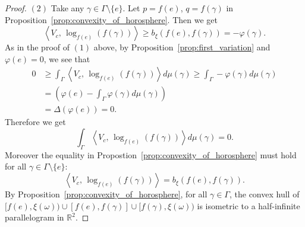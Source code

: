 \documentclass[12pt]{amsart}
\numberwithin{equation}{section}
\theoremstyle{plain}
\theoremstyle{definition}
\theoremstyle{remark}
\newcommand{\R}{{\mathbb R}}
\newcommand{\tcprj}{\log}
\newcommand{\inner}[2]{\left\langle #1,\, #2 \right\rangle}
\begin{document}
\begin{proof}
$(2)$ 
Take any $\gamma \in \Gamma \setminus \{e\}$.
Let $p=f(e)$, $q=f(\gamma)$ in Proposition~\ref{prop:convexity_of_horosphere}. 
Then we get
\begin{equation*}
 \inner{V_c}{\tcprj_{f(e)}(f(\gamma))}
  \geq b_{\xi}(f(e),f(\gamma))
  = -\varphi(\gamma). 
\end{equation*}
As in the proof of $(1)$ above, by
 Proposition~\ref{prop:first_variation} and $\varphi(e)=0$, we see that 
\begin{equation*}
\begin{split}
0 & \geq \int_{\Gamma} \inner{V_c}{\tcprj_{f(e)}(f(\gamma))}
d\mu (\gamma) 
\geq \int_{\Gamma} -\varphi(\gamma) d\mu (\gamma) \\
& = \left(
   \varphi(e) -
    \int_{\Gamma} \varphi(\gamma) d\mu(\gamma)
  \right) \\
& = \Delta (\varphi(e))=0. 
\end{split}
\end{equation*}
Therefore we get
\begin{equation}
\label{eq:harmonic_at_e2}
\int_{\Gamma} \inner{V_c}{\tcprj_{f(e)}(f(\gamma))}
d\mu(\gamma)=0. 
\end{equation}
Moreover the equality in
Propostion~\ref{prop:convexity_of_horosphere} must hold 
for all $\gamma \in \Gamma \setminus \{e\}$: 
 \begin{equation*}
  \inner{V_c}{\tcprj_{f(e)}(f(\gamma))}
  = b_{\xi}(f(e),f(\gamma)). 
 \end{equation*}
 By Proposition~\ref{prop:convexity_of_horosphere}, for all 
 $\gamma \in \Gamma$, the convex hull of
 $[f(e),\xi(\omega)) \cup [f(e),f(\gamma)] \cup [f(\gamma),\xi(\omega))$
 is isometric to a half-infinite parallelogram in $\R^2$.   


\end{proof}
\end{document}

